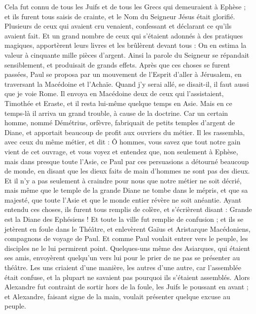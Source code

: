 \begin{multicols}{2}
{{Cela fut connu de tous les Juifs et de tous les Grecs qui demeuraient à Ephèse ; et ils furent tous saisis de crainte, et le Nom du Seigneur Jésus était glorifié.
Plusieurs de ceux qui avaient cru venaient, confessant et déclarant ce qu'ils avaient fait.
Et un grand nombre de ceux qui s'étaient adonnés à des pratiques magiques, apportèrent leurs livres et les brûlèrent devant tous : On en estima la valeur à cinquante mille pièces d'argent.
Ainsi la parole du Seigneur se répandait sensiblement, et produisait de grands effets.
Après que ces choses se furent passées, Paul se proposa par un mouvement de l'Esprit d'aller à Jérusalem, en traversant la Macédoine et l'Achaïe. Quand j'y serai allé, se disait-il, il faut aussi que je voie Rome.
Il envoya en Macédoine deux de ceux qui l'assistaient, Timothée et Eraste, et il resta lui-même quelque temps en Asie.
Mais en ce temps-là il arriva un grand trouble, à cause de la doctrine.
Car un certain homme, nommé Démétrius, orfèvre, fabriquait de petits temples d'argent de Diane, et apportait beaucoup de profit aux ouvriers du métier.
Il les rassembla, avec ceux du même métier, et dit : Ô hommes, vous savez que tout notre gain vient de cet ouvrage,
et vous voyez et entendez que, non seulement à Ephèse, mais dans presque toute l'Asie, ce Paul par ces persuasions a détourné beaucoup de monde, en disant que les dieux faits de main d'hommes ne sont pas des dieux.
Et il n'y a pas seulement à craindre pour nous que notre métier ne soit décrié, mais même que le temple de la grande Diane ne tombe dans le mépris, et que sa majesté, que toute l'Asie et que le monde entier révère ne soit anéantie.
Ayant entendu ces choses, ils furent tous remplis de colère, et s'écrièrent disant : Grande est la Diane des Ephésiens !
Et toute la ville fut remplie de confusion ; et ils se jetèrent en foule dans le Théâtre, et enlevèrent Gaïus et Aristarque Macédoniens, compagnons de voyage de Paul.
Et comme Paul voulait entrer vers le peuple, les disciples ne le lui permirent point.
Quelques-uns même des Asiarques, qui étaient ses amis, envoyèrent quelqu'un vers lui pour le prier de ne pas se présenter au théâtre.
Les uns criaient d'une manière, les autres d'une autre, car l'assemblée était confuse, et la plupart ne savaient pas pourquoi ils s'étaient assemblés.
Alors Alexandre fut contraint de sortir hors de la foule, les Juifs le poussant en avant ; et Alexandre, faisant signe de la main, voulait présenter quelque excuse au peuple.
}}
\end{multicols}
